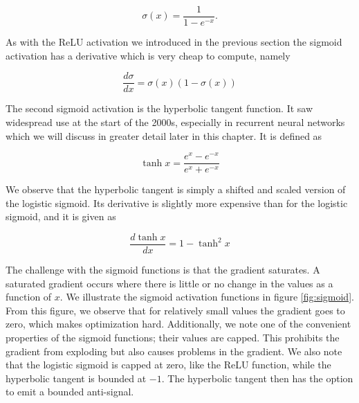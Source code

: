 \begin{equation}
\sigma(x) = \frac{1}{1-e^{-x}}.
\end{equation}

\noindent As with the ReLU activation we introduced in the previous section the sigmoid activation has a derivative which is very cheap to compute, namely

\begin{equation}
\frac{d\sigma}{dx} = \sigma(x)(1 - \sigma(x))
\end{equation}

\noindent The second sigmoid activation is the hyperbolic tangent function. It saw widespread use at the start of the 2000s, especially in recurrent neural networks which we will discuss in greater detail later in this chapter. It is defined as 

\begin{equation}
\tanh x = \frac{e^x - e^{-x}}{e^x + e^{-x}}
\end{equation}

\noindent We observe that the hyperbolic tangent is simply a shifted and scaled version of the logistic sigmoid. Its derivative is slightly more expensive than for the logistic sigmoid, and it is given as 

\begin{equation}
\frac{d \tanh x}{d x}  = 1-\tanh^2 x
\end{equation}

\noindent The challenge with the sigmoid functions is that the gradient saturates. A saturated gradient occurs where there is little or no change in the values as a function of $x$. We illustrate the sigmoid activation functions in figure \ref{fig:sigmoid}. From this figure, we observe that for relatively small values the gradient goes to zero, which makes optimization hard. Additionally, we note one of the convenient properties of the sigmoid functions; their values are capped. This prohibits the gradient from exploding but also causes problems in the gradient. We also note that the logistic sigmoid is capped at zero, like the ReLU function, while the hyperbolic tangent is bounded at $-1$. The hyperbolic tangent then has the option to emit a bounded anti-signal.

